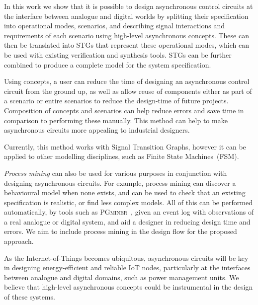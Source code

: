 \documentclass[british, journal]{IEEEtran}
\newcommand{\noun}[1]{\textsc{#1}}
\begin{document}
In this work we show that it is possible to design asynchronous control
circuits at the interface between analogue and digital worlds by
splitting their specification into operational modes, scenarios, and
describing signal interactions and requirements of each scenario using
high-level asynchronous concepts. These can then be translated into STGs
that represent these operational modes, which can be used with existing
verification and synthesis tools. STGs can be further combined to
produce a complete model for the system specification.

Using concepts, a user can reduce the time of designing an asynchronous
control circuit from the ground up, as well as allow reuse of components
either as part of a scenario or entire scenarios to reduce the design-time
of future projects. Composition of concepts and scenarios can help
reduce errors and save time in comparison to performing these manually.
This method can help to make asynchronous circuits more appealing
to industrial designers.

Currently, this method works with Signal Transition Graphs, however
it can be applied to other modelling disciplines, such as Finite State
Machines~(FSM).

\emph{Process mining} can also be used for various purposes in conjunction
with designing asynchronous circuits. For example, process mining can discover a
behavioural model when none exists, and can be used to check that an existing
specification is realistic, or find less complex models. All of this can be
performed automatically, by tools such as \noun{PGminer}~\cite{mokhov2016mining}, given
an event log with observations of a real analogue or digital system, and aid a
designer in reducing design time and errors. We aim to include process mining
in the design flow for the proposed approach.


As the Internet-of-Things becomes ubiquitous, asynchronous circuits
will be key in designing energy-efficient and reliable IoT nodes,
particularly at the interfaces between analogue and digital domains,
such as power management units. We believe that high-level asynchronous
concepts could be instrumental in the design of these systems.
\end{document}
